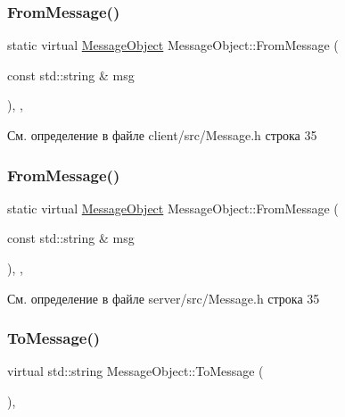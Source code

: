 \subsubsection{\texorpdfstring{FromMessage()}{FromMessage()}\hspace{0.1cm}{\footnotesize\ttfamily [1/2]}}
{\footnotesize\ttfamily static virtual \mbox{\hyperlink{class_message_object}{Message\+Object}} Message\+Object\+::\+From\+Message (\begin{DoxyParamCaption}\item[{const std\+::string \&}]{msg }\end{DoxyParamCaption})\hspace{0.3cm}{\ttfamily [inline]}, {\ttfamily [static]}, {\ttfamily [virtual]}}



См. определение в файле client/src/\+Message.\+h строка 35

\mbox{\label{class_message_object_a492e505739b933025fe9e7b0f8ee7aec}} 
\subsubsection{\texorpdfstring{FromMessage()}{FromMessage()}\hspace{0.1cm}{\footnotesize\ttfamily [2/2]}}
{\footnotesize\ttfamily static virtual \mbox{\hyperlink{class_message_object}{Message\+Object}} Message\+Object\+::\+From\+Message (\begin{DoxyParamCaption}\item[{const std\+::string \&}]{msg }\end{DoxyParamCaption})\hspace{0.3cm}{\ttfamily [inline]}, {\ttfamily [static]}, {\ttfamily [virtual]}}



См. определение в файле server/src/\+Message.\+h строка 35

\mbox{\label{class_message_object_ae123b0190cfd5623d0846593bf36de72}} 
\subsubsection{\texorpdfstring{ToMessage()}{ToMessage()}\hspace{0.1cm}{\footnotesize\ttfamily [1/2]}}
{\footnotesize\ttfamily virtual std\+::string Message\+Object\+::\+To\+Message (\begin{DoxyParamCaption}{ }\end{DoxyParamCaption})\hspace{0.3cm}{\ttfamily [inline]}, {\ttfamily [virtual]}}



